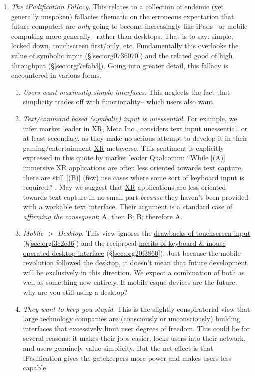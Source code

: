 \documentclass[logo,bsc,singlespacing,parskip]{infthesis}
\begin{document}
\begin{enumerate}
\item \emph{The iPadification Fallacy}.\label{ipadification fallacy}
This relates to a collection of endemic (yet generally unspoken) fallacies thematic on the erroneous expectation that future computers are \emph{only} going to become increasingly like iPads --or mobile computing more generally-- rather than desktops.
That is to say: simple, locked down, touchscreen first/only, etc.
Fundamentally this overlooks \hyperref[sec:org0736070]{the value of symbolic input} (\S \ref{sec:org0736070}) and the related \hyperref[sec:orgf7efab3]{good of high throughput} (\S \ref{sec:orgf7efab3}).
Going into greater detail, this fallacy is encountered in various forms.
\begin{enumerate}
\item \emph{Users want maximally simple interfaces}.
This neglects the fact that simplicity trades off with functionality-- which users also want.
\item \emph{Text/command based (symbolic) input is unessential}.
For example, we infer market leader in \hyperref[org39cbd51]{XR},  Meta Inc., considers text input unessential, or at least secondary, as they make no serious attempt to develop it in their gaming/entertainment \hyperref[org39cbd51]{XR} metaverse.
This sentiment is explicitly expressed in this quote by market leader Qualcomm: ``While [(A)] immersive \hyperref[org39cbd51]{XR} applications are often less oriented towards text capture, there are still [(B)] (few) use cases where some sort of keyboard input is required.'' \autocite{qualcommXRUserInterfaces}.
May we suggest that \hyperref[org39cbd51]{XR} applications are less oriented towards text capture in no small part \emph{because} they haven't been provided with a workable text interface.
Their argument is a standard case of \emph{affirming the consequent}; A, then B; B, therefore A.
\item \emph{Mobile \(>\) Desktop}.
This view ignores the \hyperref[sec:orgf3c2e36]{drawbacks of touchscreen input} (\S \ref{sec:orgf3c2e36}) and the reciprocal \hyperref[sec:org20f3860]{merits of keyboard \& mouse operated desktop interface} (\S \ref{sec:org20f3860}).
Just because the mobile revolution followed the desktop, it doesn't mean that future development will be exclusively in this direction.
We expect a combination of both as well as something new entirely.
If mobile-esque devices are the future, why are you still using a desktop?
\item \emph{They want to keep you stupid}.
This is the slightly conspiratorial view that large technology companies are (consciously or unconsciously) building interfaces that excessively limit user degrees of freedom.
This could be for several reasons: it makes their jobs easier, locks users into their network, and users genuinely value simplicity.
But the net effect is that iPadification gives the gatekeepers more power and makes users less capable.
\end{enumerate}


\end{enumerate}
\end{document}
